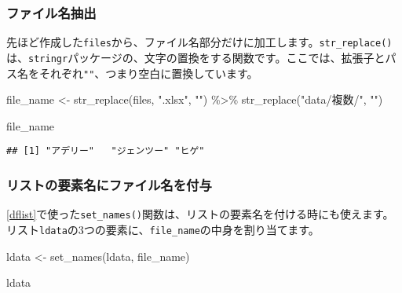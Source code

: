 \documentclass[
  xelatex,ja=standard, b5paper]{bxjsbook}
\newenvironment{Shaded}{\begin{snugshade}}{\end{snugshade}}
\newcommand{\FunctionTok}[1]{\textcolor[rgb]{0.00,0.00,0.00}{#1}}
\newcommand{\NormalTok}[1]{#1}
\newcommand{\OtherTok}[1]{\textcolor[rgb]{0.56,0.35,0.01}{#1}}
\newcommand{\SpecialCharTok}[1]{\textcolor[rgb]{0.00,0.00,0.00}{#1}}
\newcommand{\StringTok}[1]{\textcolor[rgb]{0.31,0.60,0.02}{#1}}
\begin{document}
\hypertarget{ux30d5ux30a1ux30a4ux30ebux540dux62bdux51fa}{%
\subsubsection{ファイル名抽出}\label{ux30d5ux30a1ux30a4ux30ebux540dux62bdux51fa}}

先ほど作成した\texttt{files}から、ファイル名部分だけに加工します。\texttt{str\_replace()}は、\texttt{stringr}パッケージの、文字の置換をする関数です。ここでは、拡張子とパス名をそれぞれ\texttt{""}、つまり空白に置換しています。

\begin{Shaded}
\begin{Highlighting}[]
\NormalTok{file\_name }\OtherTok{\textless{}{-}} 
  \FunctionTok{str\_replace}\NormalTok{(files, }\StringTok{".xlsx"}\NormalTok{, }\StringTok{""}\NormalTok{) }\SpecialCharTok{\%\textgreater{}\%} 
  \FunctionTok{str\_replace}\NormalTok{(}\StringTok{"data/複数/"}\NormalTok{, }\StringTok{""}\NormalTok{)}

\NormalTok{file\_name}
\end{Highlighting}
\end{Shaded}

\begin{verbatim}
## [1] "アデリー"   "ジェンツー" "ヒゲ"
\end{verbatim}

\hypertarget{ux30eaux30b9ux30c8ux306eux8981ux7d20ux540dux306bux30d5ux30a1ux30a4ux30ebux540dux3092ux4ed8ux4e0e}{%
\subsubsection{リストの要素名にファイル名を付与}\label{ux30eaux30b9ux30c8ux306eux8981ux7d20ux540dux306bux30d5ux30a1ux30a4ux30ebux540dux3092ux4ed8ux4e0e}}

\ref{dflist}で使った\texttt{set\_names()}関数は、リストの要素名を付ける時にも使えます。リスト\texttt{ldata}の3つの要素に、\texttt{file\_name}の中身を割り当てます。

\begin{Shaded}
\begin{Highlighting}[]
\NormalTok{ldata }\OtherTok{\textless{}{-}}
    \FunctionTok{set\_names}\NormalTok{(ldata, file\_name)}

\NormalTok{ldata}
\end{Highlighting}
\end{Shaded}
\end{document}

